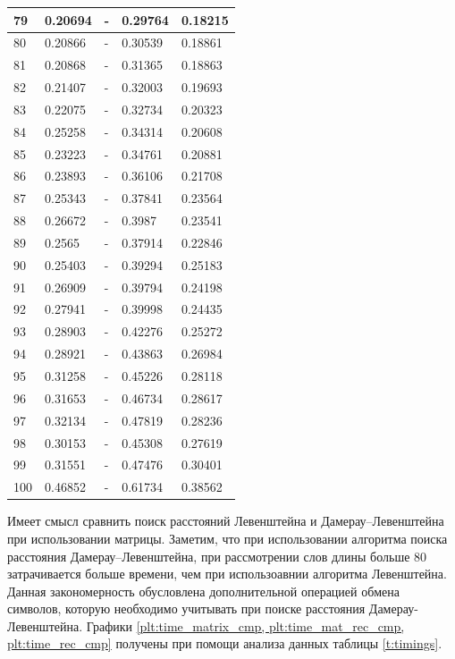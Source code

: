 \begin{tiny}
\begin{longtable}{|l|l|l|l|l|}
        79 & 0.20694 & - & 0.29764 & 0.18215 \\ \hline
        80 & 0.20866 & - & 0.30539 & 0.18861 \\ \hline
        81 & 0.20868 & - & 0.31365 & 0.18863 \\ \hline
        82 & 0.21407 & - & 0.32003 & 0.19693 \\ \hline
        83 & 0.22075 & - & 0.32734 & 0.20323 \\ \hline
        84 & 0.25258 & - & 0.34314 & 0.20608 \\ \hline
        85 & 0.23223 & - & 0.34761 & 0.20881 \\ \hline
        86 & 0.23893 & - & 0.36106 & 0.21708 \\ \hline
        87 & 0.25343 & - & 0.37841 & 0.23564 \\ \hline
        88 & 0.26672 & - & 0.3987 & 0.23541 \\ \hline
        89 & 0.2565 & - & 0.37914 & 0.22846 \\ \hline
        90 & 0.25403 & - & 0.39294 & 0.25183 \\ \hline
        91 & 0.26909 & - & 0.39794 & 0.24198 \\ \hline
        92 & 0.27941 & - & 0.39998 & 0.24435 \\ \hline
        93 & 0.28903 & - & 0.42276 & 0.25272 \\ \hline
        94 & 0.28921 & - & 0.43863 & 0.26984 \\ \hline
        95 & 0.31258 & - & 0.45226 & 0.28118 \\ \hline
        96 & 0.31653 & - & 0.46734 & 0.28617 \\ \hline
        97 & 0.32134 & - & 0.47819 & 0.28236 \\ \hline
        98 & 0.30153 & - & 0.45308 & 0.27619 \\ \hline
        99 & 0.31551 & - & 0.47476 & 0.30401 \\ \hline
        100 & 0.46852 & - & 0.61734 & 0.38562 \\ \hline
    \end{longtable}
\end{tiny}

Имеет смысл сравнить поиск расстояний Левенштейна и Дамерау--Левенштейна при использовании матрицы. Заметим, что при использовании
алгоритма поиска расстояния Дамерау--Левенштейна, при рассмотрении слов длины больше 80 затрачивается больше времени, чем 
при использоавнии алгоритма Левенштейна. Данная закономерность обусловлена дополнительной операцией обмена символов, которую 
необходимо учитывать при поиске расстояния Дамерау-Левенштейна. Графики \ref{plt:time_matrix_cmp, plt:time_mat_rec_cmp, plt:time_rec_cmp} получены при 
помощи анализа данных таблицы \ref{t:timings}.

